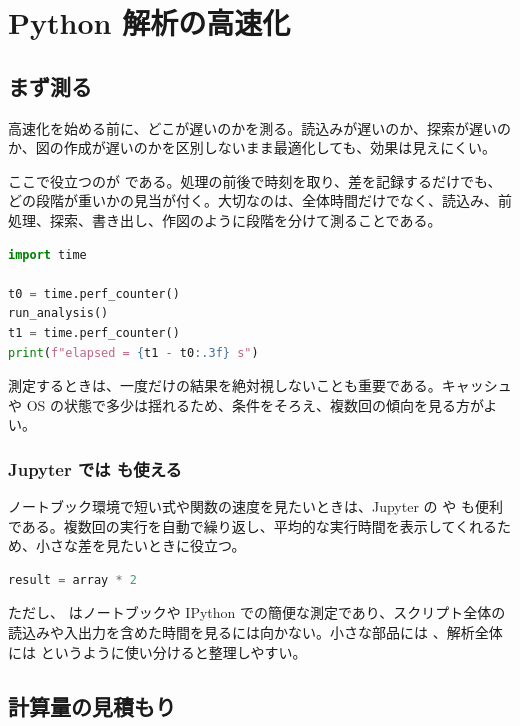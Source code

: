 \chapter{Python 解析の高速化}

\section{まず測る}

高速化を始める前に、どこが遅いのかを測る。読込みが遅いのか、探索が遅いのか、図の作成が遅いのかを区別しないまま最適化しても、効果は見えにくい。

ここで役立つのが  である。処理の前後で時刻を取り、差を記録するだけでも、どの段階が重いかの見当が付く。大切なのは、全体時間だけでなく、読込み、前処理、探索、書き出し、作図のように段階を分けて測ることである。

\begin{lstlisting}[language=Python]
import time

t0 = time.perf_counter()
run_analysis()
t1 = time.perf_counter()
print(f"elapsed = {t1 - t0:.3f} s")
\end{lstlisting}

測定するときは、一度だけの結果を絶対視しないことも重要である。キャッシュや OS の状態で多少は揺れるため、条件をそろえ、複数回の傾向を見る方がよい。

\subsection{Jupyter では  も使える}

ノートブック環境で短い式や関数の速度を見たいときは、Jupyter の  や  も便利である。複数回の実行を自動で繰り返し、平均的な実行時間を表示してくれるため、小さな差を見たいときに役立つ。

\begin{lstlisting}[language=Python]
%%timeit
result = array * 2
\end{lstlisting}

ただし、 はノートブックや IPython での簡便な測定であり、スクリプト全体の読込みや入出力を含めた時間を見るには向かない。小さな部品には 、解析全体には  というように使い分けると整理しやすい。

\section{計算量の見積もり}

